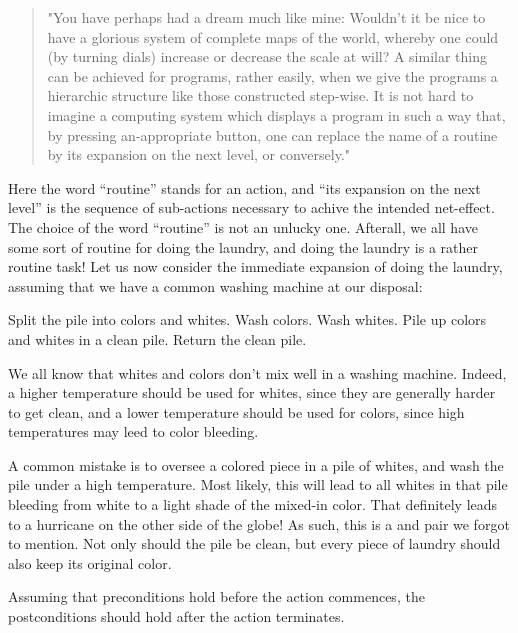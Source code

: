 \begin{quote}"You have perhaps had a dream much like mine: Wouldn't it be nice
to have a glorious system of complete maps of the world, whereby one could (by
turning dials) increase or decrease the scale at will? A similar thing can be
achieved for programs, rather easily, when we give the programs a hierarchic
structure like those constructed step-wise. It is not hard to imagine a
computing system which displays a program in such a way that, by pressing
an-appropriate button, one can replace the name of a routine by its expansion
on the next level, or conversely."\end{quote}

Here the word ``routine'' stands for an action, and ``its expansion on the next
level'' is the sequence of sub-actions necessary to achive the intended
net-effect. The choice of the word ``routine'' is not an unlucky one. Afterall,
we all have some sort of routine for doing the laundry, and doing the laundry
is a rather routine task! Let us now consider the immediate expansion of doing
the laundry, assuming that we have a common washing machine at our disposal:

\begin{codebox}
\li Split the pile into colors and whites.
\li Wash colors.
\li Wash whites.
\li Pile up colors and whites in a clean pile.
\li Return the clean pile.
\end{codebox}

We all know that whites and colors don't mix well in a washing machine. Indeed,
a higher temperature should be used for whites, since they are generally harder
to get clean, and a lower temperature should be used for colors, since high
temperatures may leed to color bleeding.

A common mistake is to oversee a colored piece in a pile of whites, and wash
the pile under a high temperature.  Most likely, this will lead to all whites
in that pile bleeding from white to a light shade of the mixed-in color. That
definitely leads to a hurricane on the other side of the globe!  As such, this
is a  and  pair we forgot to mention. Not only
should the pile be clean, but every piece of laundry should also keep its
original color.

\begin{definition}

Assuming that preconditions hold before the action commences, the
postconditions should hold after the action terminates.

\end{definition}

